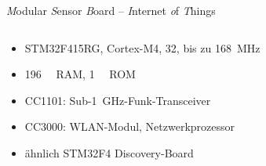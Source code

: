 \documentclass[xcolor=svgnames]{beamer}
\newcommand*{\ukB}[1]{\SI{#1}{\kilo\byte}}
\newcommand*{\uMB}[1]{\SI{#1}{\mega\byte}}
\newcommand*{\ubit}[1]{\SI{#1}{\bit}}
\newcommand*{\uMHz}[1]{\SI{#1}{\mega\hertz}}
\newcommand*{\uGHz}[1]{\SI{#1}{\giga\hertz}}
\newcommand*{\bild}[1]{../bach/bilder/#1}
\begin{document}

\begin{frame}{\emph{M}odular \emph{S}ensor \emph{B}oard – \emph{I}nternet \emph{o}f \emph{T}hings}

\begin{columns}
\begin{column}{0.55\textwidth}
\begin{itemize}
\item STM32F415RG, Cortex-M4, \ubit{32}, bis zu \uMHz{168}
\item \ukB{196} RAM, \uMB{1} ROM
\item CC1101: Sub-\uGHz{1}-Funk-Transceiver
\item CC3000: WLAN-Modul, Netzwerkprozessor
\item ähnlich STM32F4 Discovery-Board
\end{itemize}
\end{column}

\begin{column}{0.4\textwidth}
\texttt{[image: \\bild\{msbiot-draufsicht.png]}}
\end{column}
\end{columns}
    
\end{frame}

\end{document}

